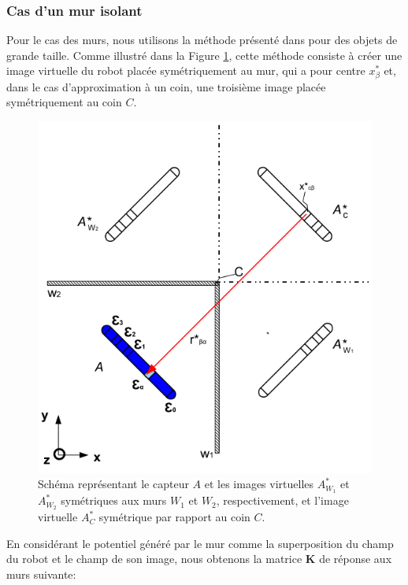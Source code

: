 \subsubsection{Cas d'un mur isolant}

Pour le cas des murs, nous utilisons la méthode présenté dans \cite{Jackson2012} pour des objets de grande taille. Comme illustré dans la Figure \ref{fig:schema_murs_coins}, cette méthode consiste à créer une image virtuelle du robot placée symétriquement au mur, qui a pour centre $x_\beta^*$ et, dans le cas d'approximation à un coin, une troisième image placée symétriquement au coin $C$. 

\begin{figure}[h!]
    \centering
    \includegraphics[scale=0.5]{doc/img/schema_murs_coins.png}
    \caption{Schéma représentant le capteur $A$ et les images virtuelles $A_{W_1}^*$ et $A_{W_2}^*$ symétriques aux murs $W_{1}$ et $W_{2}$, respectivement, et l'image virtuelle $A_C^*$ symétrique par rapport au coin $C$. }
    \label{fig:schema_murs_coins}
\end{figure}

En considérant le potentiel généré par le mur comme la superposition du champ du robot et le champ de son image, nous obtenons la matrice $\mathbf{K}$ de réponse aux murs suivante: 

